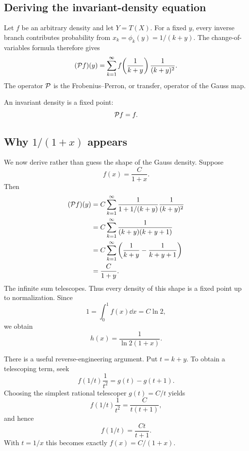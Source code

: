 \documentclass[a4paper]{article}
\begin{document}
\subsection{Deriving the invariant-density equation}
Let $f$ be an arbitrary density and let $Y=T(X)$. For a fixed $y$, every inverse branch contributes probability from $x_k=\phi_k(y)=1/(k+y)$. The change-of-variables formula therefore gives
\begin{equation}
 (\mathcal{P} f)(y)=\sum_{k=1}^{\infty}f\!\left(\frac1{k+y}\right)\frac1{(k+y)^2}.
 \label{gkw:eq:PF}
\end{equation}
The operator $\mathcal{P}$ is the Frobenius--Perron, or transfer, operator of the Gauss map.

An invariant density is a fixed point:
\begin{equation}
 \mathcal{P} f=f.
 \label{gkw:eq:fixed}
\end{equation}

\subsection{Why $1/(1+x)$ appears}
We now derive rather than guess the shape of the Gauss density. Suppose
\begin{equation}
 f(x)=\frac{C}{1+x}.
\end{equation}
Then
\begin{align}
 (\mathcal{P} f)(y)
 &=C\sum_{k=1}^{\infty}
 \frac{1}{1+1/(k+y)}\frac1{(k+y)^2}\\
 &=C\sum_{k=1}^{\infty}
 \frac1{(k+y)(k+y+1)}\\
 &=C\sum_{k=1}^{\infty}
 \left(\frac1{k+y}-\frac1{k+y+1}\right)\\
 &=\frac{C}{1+y}.
\end{align}
The infinite sum telescopes. Thus every density of this shape is a fixed point up to normalization. Since
\begin{equation}
 1=\int_0^1f(x)\dd x=C\ln2,
\end{equation}
we obtain
\begin{equation}
 \boxed{h(x)=\frac1{\ln2(1+x)}}.
\end{equation}

There is a useful reverse-engineering argument. Put $t=k+y$. To obtain a telescoping term, seek
\begin{equation}
 f(1/t)\frac1{t^2}=g(t)-g(t+1).
\end{equation}
Choosing the simplest rational telescoper $g(t)=C/t$ yields
\begin{equation}
 f(1/t)\frac1{t^2}=\frac{C}{t(t+1)},
\end{equation}
and hence
\begin{equation}
 f(1/t)=\frac{Ct}{t+1}.
\end{equation}
With $t=1/x$ this becomes exactly $f(x)=C/(1+x)$.
\end{document}
